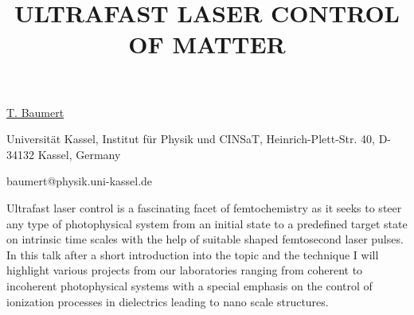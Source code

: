 \title{ULTRAFAST LASER CONTROL OF MATTER}

\underline{T. Baumert} 

{\normalsize{\vspace{-4mm}
Universit\"at Kassel, Institut f\"ur Physik und CINSaT,
Heinrich-Plett-Str. 40, D-34132 Kassel, Germany

\email baumert@physik.uni-kassel.de}}

Ultrafast laser control is a fascinating facet of femtochemistry as it
seeks to steer any type of photophysical system from an initial state to
a predefined target state on intrinsic time scales with the help of
suitable shaped femtosecond laser pulses.
In this talk after a short introduction into the topic and the technique
I will highlight various projects from our laboratories ranging from
coherent to incoherent photophysical systems with a special emphasis on
the control of ionization processes in dielectrics leading to nano scale
structures.

\vspace{\baselineskip}